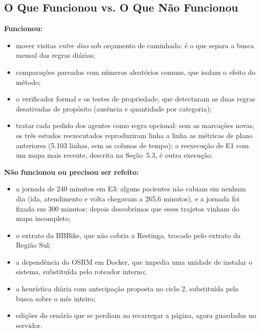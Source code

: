 \documentclass[11pt,a4paper]{article}
\begin{document}
\subsection{O Que Funcionou vs. O Que Não Funcionou}
\textbf{Funcionou:}
\begin{itemize}
    \item mover visitas \emph{entre dias} sob orçamento de caminhada: é o que separa a busca mensal das regras diárias;
    \item comparações pareadas com números aleatórios comuns, que isolam o efeito do método;
    \item o verificador formal e os testes de propriedade, que detectaram as duas regras desativadas de propósito (ausência e quantidade por categoria);
    \item tratar cada pedido dos agentes como regra opcional: sem as marcações novas, os três estudos reexecutados reproduziram linha a linha as métricas de plano anteriores (5.103 linhas, sem as colunas de tempo); a reexecução de E1 com um mapa mais recente, descrita na Seção~5.3, é outra execução.
\end{itemize}
\textbf{Não funcionou ou precisou ser refeito:}
\begin{itemize}
    \item a jornada de 240 minutos em E3: alguns pacientes não cabiam em nenhum dia (ida, atendimento e volta chegavam a 265,6 minutos), e a jornada foi fixada em 300 minutos; depois descobrimos que esses trajetos vinham do mapa incompleto;
    \item o extrato da BBBike, que não cobria a Restinga, trocado pelo extrato da Região Sul;
    \item a dependência do OSRM em Docker, que impedia uma unidade de instalar o sistema, substituída pelo roteador interno;
    \item a heurística diária com antecipação proposta no ciclo 2, substituída pela busca sobre o mês inteiro;
    \item edições do cenário que se perdiam ao recarregar a página, agora guardadas no servidor.
\end{itemize}
\end{document}
